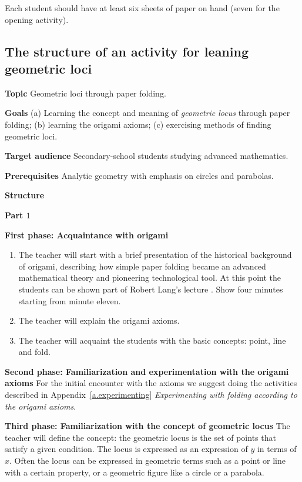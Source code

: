 Each student should have at least six sheets of paper on hand (seven for the opening activity).

\subsection{The structure of an activity for leaning geometric loci}

\textbf{Topic} Geometric loci through paper folding.

\bigskip

\textbf{Goals} (a) Learning the concept and meaning of \emph{geometric locus} through paper folding; (b) learning the origami axioms; (c) exercising methods of finding geometric loci.

\bigskip

\textbf{Target audience} Secondary-school students studying advanced mathematics.

\bigskip

\textbf{Prerequisites} Analytic geometry with emphasis on circles and parabolas.

\newpage

\textbf{Structure}

\textbf{Part $1$}

\textbf{First phase: Acquaintance with origami}

\begin{enumerate}
\item The teacher will start with a brief presentation of the historical background of origami, describing how simple paper folding became an advanced mathematical theory and pioneering technological tool. At this point the students can be shown part of Robert Lang's lecture \cite{lang-ted}. Show four minutes starting from minute eleven.

\item The teacher will explain the origami axioms.

\item The teacher will acquaint the students with the basic concepts: point, line and fold.
\end{enumerate}

\textbf{Second phase: Familiarization and experimentation with the origami axioms} For the initial encounter with the axioms we suggest doing the activities described in Appendix~\ref{a.experimenting} \textit{Experimenting with folding according to the origami axioms}. 

\textbf{Third phase: Familiarization with the concept of geometric locus} The teacher will define the concept: the geometric locus is the set of points that satisfy a given condition. The locus is expressed as an expression of $y$ in terms of $x$. Often the locus can be expressed in geometric terms such as a point or line with a certain property, or a geometric figure like a circle or a parabola.


